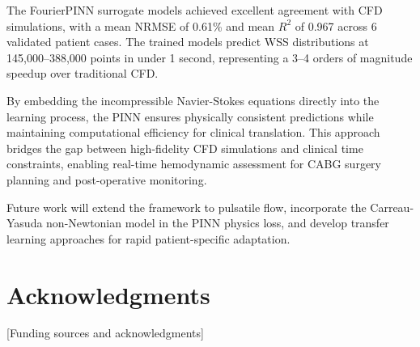 \documentclass[12pt,a4paper]{article}
\begin{document}
The FourierPINN surrogate models achieved excellent agreement with CFD simulations, with a mean NRMSE of 0.61\% and mean $R^2$ of 0.967 across 6 validated patient cases. The trained models predict WSS distributions at 145,000--388,000 points in under 1 second, representing a 3--4 orders of magnitude speedup over traditional CFD.

By embedding the incompressible Navier-Stokes equations directly into the learning process, the PINN ensures physically consistent predictions while maintaining computational efficiency for clinical translation. This approach bridges the gap between high-fidelity CFD simulations and clinical time constraints, enabling real-time hemodynamic assessment for CABG surgery planning and post-operative monitoring.

Future work will extend the framework to pulsatile flow, incorporate the Carreau-Yasuda non-Newtonian model in the PINN physics loss, and develop transfer learning approaches for rapid patient-specific adaptation.

\section*{Acknowledgments}

[Funding sources and acknowledgments]
\end{document}
